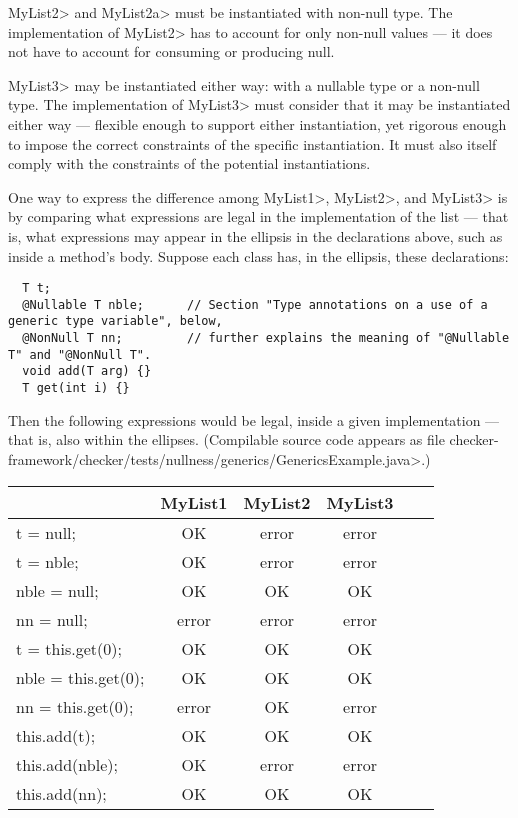 \<MyList2> and \<MyList2a> must be instantiated with non-null type.
The implementation of \<MyList2> has to account for only non-null values --- it
does not have to account for consuming or producing null.

\<MyList3> may be instantiated either way:
with a nullable type or a non-null type.  The implementation of \<MyList3> must consider
that it may be instantiated either way --- flexible enough to support either
instantiation, yet rigorous enough to impose the correct constraints of the
specific instantiation.  It must also itself comply with the constraints of
the potential instantiations.

One way to express the difference among \<MyList1>, \<MyList2>, and
\<MyList3> is by comparing what expressions are legal in the implementation
of the list --- that is, what expressions may appear in the ellipsis in the
declarations above, such as inside a method's body.  Suppose each class
has, in the ellipsis, these declarations:

\begin{Verbatim}
  T t;
  @Nullable T nble;      // Section "Type annotations on a use of a generic type variable", below,
  @NonNull T nn;         // further explains the meaning of "@Nullable T" and "@NonNull T".
  void add(T arg) {}
  T get(int i) {}
\end{Verbatim}

\noindent
Then the following expressions would be legal, inside a given
implementation --- that is, also within the ellipses.
(Compilable source code appears as file
\<checker-framework/checker/tests/nullness/generics/GenericsExample.java>.)

\begin{tabular}{|l|c|c|c|c|c|} \hline
                        & MyList1 & MyList2 & MyList3 \\ \hline
  t = null;             & OK      & error   & error   \\ \hline
  t = nble;             & OK      & error   & error   \\ \hline
  nble = null;          & OK      & OK      & OK      \\ \hline
  nn = null;            & error   & error   & error   \\ \hline
  t = this.get(0);      & OK      & OK      & OK      \\ \hline
  nble = this.get(0);   & OK      & OK      & OK      \\ \hline
  nn = this.get(0);     & error   & OK      & error   \\ \hline
  this.add(t);          & OK      & OK      & OK      \\ \hline
  this.add(nble);       & OK      & error   & error   \\ \hline
  this.add(nn);         & OK      & OK      & OK      \\ \hline
\end{tabular}


